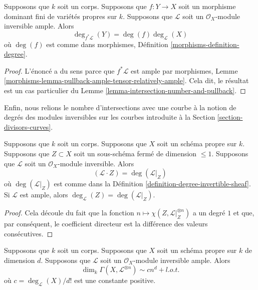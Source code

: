 \begin{lemma}
\label{lemma-degree-finite-morphism-in-terms-degrees}
Supposons que $k$ soit un corps. Supposons que $f :
Y \to X$ soit un morphisme dominant fini de
variétés propres sur $k$. Supposons que $\mathcal{L}$
soit un $\mathcal{O}_X$-module inversible ample. Alors
$$
\deg_{f^*\mathcal{L}}(Y) = \deg(f) \deg_\mathcal{L}(X)
$$
où $\deg(f)$ est comme dans morphismes,
Définition \ref{morphisms-definition-degree}.
\end{lemma}

\begin{proof}
L'énoncé a du sens parce que $f^*\mathcal{L}$ est ample par
morphismes, Lemme
\ref{morphisms-lemma-pullback-ample-tensor-relatively-ample}. Cela dit, le
résultat est un cas particulier du Lemme \ref{lemma-intersection-number-and-pullback}.
\end{proof}

\noindent
Enfin, nous relions le nombre d'intersections avec une
courbe à la notion de degrés des modules inversibles sur les
courbes introduite à la Section \ref{section-divisors-curves}.

\begin{lemma}
\label{lemma-intersection-numbers-and-degrees-on-curves}
Supposons que $k$ soit un corps. Supposons que $X$ soit un
schéma propre sur $k$. Supposons que $Z \subset X$ soit un
sous-schéma fermé de dimension $\leq 1$. Supposons que
$\mathcal{L}$ soit un $\mathcal{O}_X$-module inversible. Alors
$$
(\mathcal{L} \cdot Z) = \deg(\mathcal{L}|_Z)
$$
où $\deg(\mathcal{L}|_Z)$ est comme dans la
Définition
\ref{definition-degree-invertible-sheaf}. Si $\mathcal{L}$
est ample, alors $\deg_\mathcal{L}(Z) = \deg(\mathcal{L}|_Z)$.
\end{lemma}

\begin{proof}
Cela découle du fait que la fonction $n \mapsto \chi(Z,
\mathcal{L}|_Z^{\otimes n})$ a un degré $1$ et que, par conséquent,
le coefficient directeur est la différence des valeurs consécutives.
\end{proof}

\begin{proposition}
\label{proposition-asymptotic-riemann-roch}
Supposons que $k$ soit un corps. Supposons que $X$ soit un
schéma propre sur $k$ de dimension $d$. Supposons que
$\mathcal{L}$ soit un $\mathcal{O}_X$-module inversible ample. Alors
$$
\dim_k \Gamma(X, \mathcal{L}^{\otimes n}) \sim c n^d + l.o.t.
$$
où $c = \deg_\mathcal{L}(X)/d!$ est une constante positive.
\end{proposition}

